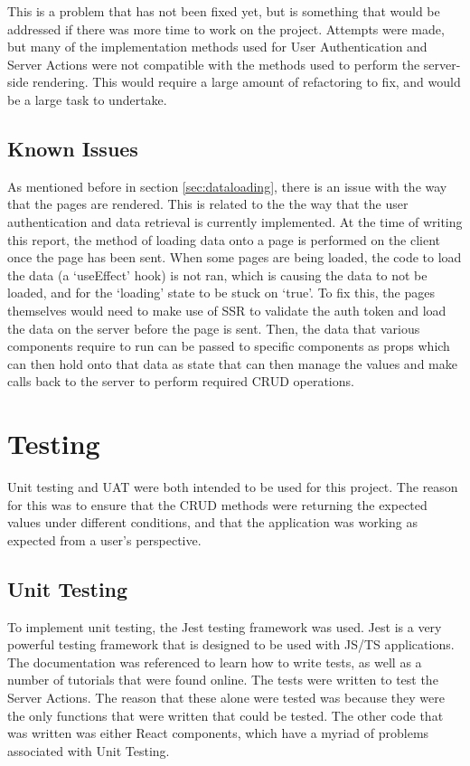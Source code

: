 \documentclass[11pt, a4paper,twoside]{report}
\theoremstyle{plain} %
\theoremstyle{definition} %
\numberwithin{equation}{chapter}
\begin{document}
This is a problem that has not been fixed yet, but is something that would be
addressed if there was more time to work on the project. Attempts were made,
but many of the implementation methods used for User Authentication and Server
Actions were not compatible with the methods used to perform the server-side
rendering. This would require a large amount of refactoring to fix, and would
be a large task to undertake.

\section{Known Issues}\label{sec:knownissues}

As mentioned before in section \ref{sec:dataloading}, there is an issue with
the way that the pages are rendered. This is related to the the way that the
user authentication and data retrieval is currently implemented. At the time of
writing this report, the method of loading data onto a page is performed on the
client once the page has been sent. When some pages are being loaded, the code
to load the data (a `useEffect' hook) is not ran, which is causing the data to
not be loaded, and for the `loading' state to be stuck on `true'. To fix this,
the pages themselves would need to make use of SSR to validate the auth token
and load the data on the server before the page is sent. Then, the data that
various components require to run can be passed to specific components as props
which can then hold onto that data as state that can then manage the values and
make calls back to the server to perform required CRUD operations.

\chapter{Testing}\label{ch:testing}

Unit testing and UAT were both intended to be used for this project. The reason
for this was to ensure that the CRUD methods were returning the expected values
under different conditions, and that the application was working as expected
from a user's perspective.

\section{Unit Testing}\label{sec:unittesting}

To implement unit testing, the Jest testing framework was used. Jest is a very
powerful testing framework that is designed to be used with JS/TS applications.
The documentation was referenced to learn how to write
tests\cite{learn-jest-1}, as well as a number of tutorials that were found
online\cite{learn-jest-2}\cite{learn-jest-3}. The tests were written to test
the Server Actions. The reason that these alone were tested was because they
were the only functions that were written that could be tested. The other code
that was written was either React components, which have a myriad of problems
associated with Unit Testing.
\end{document}
